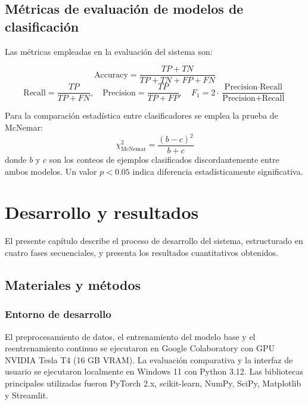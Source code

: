 \documentclass[11pt,spanish]{citedi}
\begin{document}
\section{Métricas de evaluación de modelos de clasificación}

Las métricas empleadas en la evaluación del sistema son:

\begin{equation}
\text{Accuracy} = \frac{TP + TN}{TP + TN + FP + FN}
\end{equation}
\begin{equation}
\text{Recall} = \frac{TP}{TP + FN}, \quad
\text{Precision} = \frac{TP}{TP + FP}, \quad
F_1 = 2 \cdot \frac{\text{Precision} \cdot \text{Recall}}{\text{Precision} + \text{Recall}}
\end{equation}

Para la comparación estadística entre clasificadores se emplea la prueba de McNemar:
\begin{equation}
\chi^2_{\text{McNemar}} = \frac{(b - c)^2}{b + c}
\end{equation}
donde $b$ y $c$ son los conteos de ejemplos clasificados discordantemente entre ambos modelos. Un valor $p < 0.05$ indica diferencia estadísticamente significativa.

\chapter{Desarrollo y resultados}

El presente capítulo describe el proceso de desarrollo del sistema, estructurado en cuatro fases secuenciales, y presenta los resultados cuantitativos obtenidos.

\section{Materiales y métodos}

\subsection{Entorno de desarrollo}

El preprocesamiento de datos, el entrenamiento del modelo base y el reentrenamiento continuo se ejecutaron en Google Colaboratory con GPU NVIDIA Tesla T4 (16 GB VRAM). La evaluación comparativa y la interfaz de usuario se ejecutaron localmente en Windows 11 con Python 3.12. Las bibliotecas principales utilizadas fueron PyTorch 2.x, scikit-learn, NumPy, SciPy, Matplotlib y Streamlit.
\end{document}
